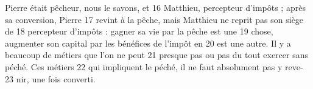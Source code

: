 Pierre était pêcheur, nous le savons, et	 
16	 	Matthieu, percepteur d'impôts ; après sa conversion, Pierre	 
17	 	revint à la pêche, mais Matthieu ne reprit pas son siège de	 
18	 	percepteur d'impôts : gagner sa vie par la pêche est une	 
19	 	chose, augmenter son capital par les bénéfices de l'impôt en	 
20	 	est une autre. Il y a beaucoup de métiers que l'on ne peut	 
21	 	presque pas ou pas du tout exercer sans péché. Ces métiers	 
22	 	qui impliquent le péché, il ne faut absolument pas y reve-	 
23	 	nir, une fois converti.